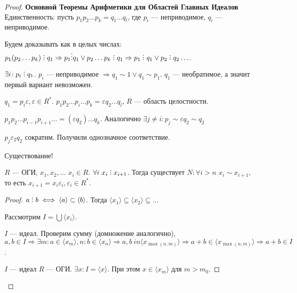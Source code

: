 \begin{proof}
\textbf{Основной Теоремы Арифметики для Областей Главных Идеалов} 
    Единственность: пусть $p_1p_2\ldots p_k =q_1 \ldots q_l$, где $p_i$ --- неприводимое,  $q_i$ --- неприводимое. 

    Будем доказывать как в целых числах:  $p_1(p_2\ldots p_k) \divby q_1 \Rightarrow p_1 \vdots q_1 \lor p_2\ldots p_k \divby q_1 \Rightarrow p_1 \divby q_1 \lor p_2 \divby q_2 \ldots$.

     $\exists i\!: p_i \divby q_1$. $p_i$ --- неприводимое $\Rightarrow q_1 \sim 1 \lor q_1 \sim p_1$. $q_1$ --- необратимое, а значит первый вариант невозможен.

     $q_1 = p_i \varepsilon, \varepsilon \in R^*$. $p_1p_2\ldots p_i \ldots p_k = \varepsilon q_2 \ldots q_l$, $R$ --- область целостности.

     $p_1p_2\ldots p_{i-1}p_{i+1}\ldots = (\varepsilon q_2) \ldots q_k$. Аналогично $\exists j \neq i\!: p_j \sim \varepsilon q_2 \sim q_2$ 

     $p_j \varepsilon_2 q_2$ сократим. Получили однозначное соответствие. 


     Существование!
     \begin{lemma}
    $R$ --- ОГИ,  $x_1,x_2,\ldots$ $x_i \in R$.  $\forall i\ x_i \divby x_{i+1}$. Тогда существует  $N\!: \forall i > n$  $x_i \sim x_{i+1}$, то есть  $x_{i+1} = x_i \varepsilon_i, \varepsilon_i \in R^*$. 
    \end{lemma}
    \begin{proof}
        $a \divby b \iff \langle a \rangle \subset \langle b \rangle$. Тогда  $\langle x_1 \rangle \subseteq \langle x_2 \rangle \subseteq \ldots$

        Рассмотрим $I = \bigcup \langle x_i\rangle$.

        $I$ --- идеал. Проверим сумму (домножение аналогично),  $a, b \in I \Rightarrow \exists m\!: a \in \langle x_m \rangle, n\!: b \in \langle x_n \rangle \Rightarrow a, b\ in \langle x_{\max(n, m)} \rangle \Rightarrow a + b \in \langle x_{\max(n, m)} \rangle \Rightarrow a + b \in I$.

        $I$ --- идеал  $R$ --- ОГИ.  $\exists x\!: I = \langle x \rangle$. При этом $x \in \langle x_m \rangle$ для  $m > m_0$.


\end{proof}
\end{proof}
